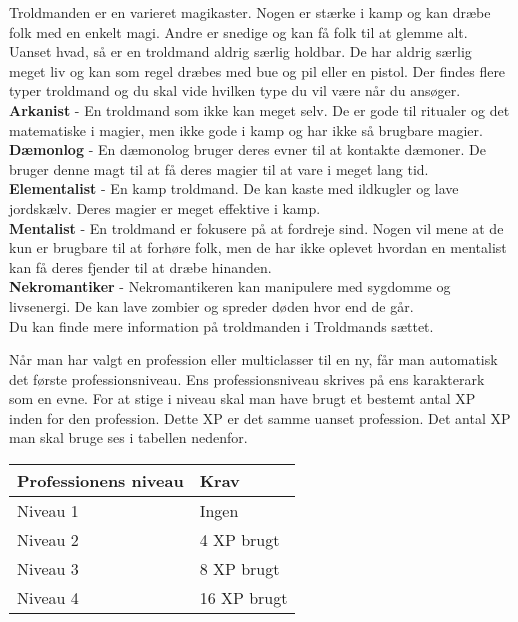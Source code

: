 \begin{prof*}
Troldmanden er en varieret magikaster. Nogen er stærke i kamp og kan dræbe folk med en enkelt magi. Andre er snedige og kan få folk til at glemme alt. Uanset hvad, så er en troldmand aldrig særlig holdbar. De har aldrig særlig meget liv og kan som regel dræbes med bue og pil eller en pistol. Der findes flere typer troldmand og du skal vide hvilken type du vil være når du ansøger.\\
\textbf{Arkanist} - En troldmand som ikke kan meget selv. De er gode til ritualer og det matematiske i magier, men ikke gode i kamp og har ikke så brugbare magier.\\
\textbf{Dæmonlog} - En dæmonolog bruger deres evner til at kontakte dæmoner. De bruger denne magt til at få deres magier til at vare i meget lang tid.\\
\textbf{Elementalist} - En kamp troldmand. De kan kaste med ildkugler og lave jordskælv. Deres magier er meget effektive i kamp.\\
\textbf{Mentalist} - En troldmand er fokusere på at fordreje sind. Nogen vil mene at de kun er brugbare til at forhøre folk, men de har ikke oplevet hvordan en mentalist kan få deres fjender til at dræbe hinanden.\\
\textbf{Nekromantiker} - Nekromantikeren kan manipulere med sygdomme og livsenergi. De kan lave zombier og spreder døden hvor end de går.\\
Du kan finde mere information på troldmanden i Troldmands sættet.
\end{prof*}

Når man har valgt en profession eller multiclasser til en ny, får man automatisk det første professionsniveau. Ens professionsniveau skrives på ens karakterark som en evne. For at stige i niveau skal man have brugt et bestemt antal XP inden for den profession. Dette XP er det samme uanset profession.
Det antal XP man skal bruge ses i tabellen nedenfor.

\begin{table}[!htbp]
    \centering
    \begin{tabular}{|p{}|p{}|}
    \rowcolor{cerulean!80}\hline
        Professionens niveau & Krav \\\hline

        Niveau 1 & Ingen \\\hline
        Niveau 2 & 4 XP brugt \\\hline
        Niveau 3 & 8 XP brugt \\\hline
        Niveau 4 & 16 XP brugt \\\hline
    \end{tabular}
\end{table}

